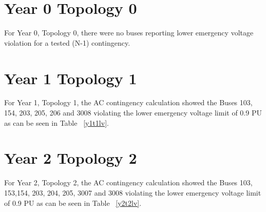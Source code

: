 \documentclass[10pt]{report}
\begin{document}
\section{Year 0 Topology 0}

For Year 0, Topology 0, there were no buses reporting lower emergency voltage violation for a tested (N-1) contingency. 

\section{Year 1 Topology 1}

For Year 1, Topology 1, the AC contingency calculation showed the Buses 103, 154, 203, 205, 206 and 3008 violating the lower emergency voltage limit of 0.9 PU as can be seen in Table ~\ref{y1t1lv}.

\begin{table}[H]
\caption{Lower emergency voltage violation counts - Buses with Contingencies - Year 1, Topology 1}
\label{y1t1lv}
\centering
{}
\end{table}

\section{Year 2 Topology 2}

For Year 2, Topology 2, the AC contingency calculation showed the Buses 103, 153,154, 203, 204, 205, 3007 and 3008 violating the lower emergency voltage limit of 0.9 PU as can be seen in Table ~\ref{y2t2lv}.
\end{document}
